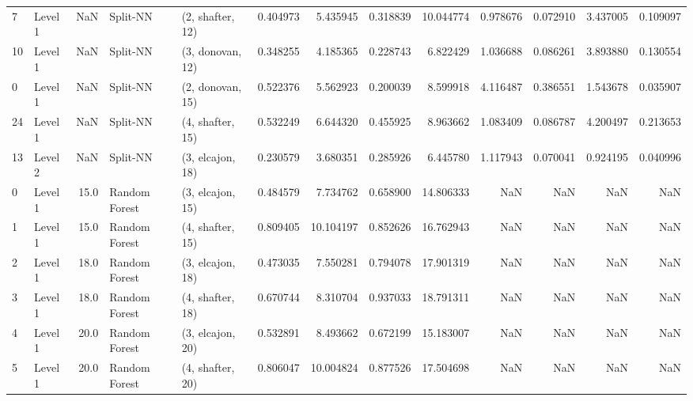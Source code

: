 \begin{tabular}{llrllrrrrrrrr}
7  &   Level 1 &    NaN &       Split-NN &  (2, shafter, 12) &   0.404973 &   5.435945 &  0.318839 &  10.044774 &             0.978676 &               0.072910 &            3.437005 &              0.109097 \\
10 &   Level 1 &    NaN &       Split-NN &  (3, donovan, 12) &   0.348255 &   4.185365 &  0.228743 &   6.822429 &             1.036688 &               0.086261 &            3.893880 &              0.130554 \\
0  &   Level 1 &    NaN &       Split-NN &  (2, donovan, 15) &   0.522376 &   5.562923 &  0.200039 &   8.599918 &             4.116487 &               0.386551 &            1.543678 &              0.035907 \\
24 &   Level 1 &    NaN &       Split-NN &  (4, shafter, 15) &   0.532249 &   6.644320 &  0.455925 &   8.963662 &             1.083409 &               0.086787 &            4.200497 &              0.213653 \\
13 &   Level 2 &    NaN &       Split-NN &  (3, elcajon, 18) &   0.230579 &   3.680351 &  0.285926 &   6.445780 &             1.117943 &               0.070041 &            0.924195 &              0.040996 \\
0  &   Level 1 &   15.0 &  Random Forest &  (3, elcajon, 15) &   0.484579 &   7.734762 &  0.658900 &  14.806333 &                  NaN &                    NaN &                 NaN &                   NaN \\
1  &   Level 1 &   15.0 &  Random Forest &  (4, shafter, 15) &   0.809405 &  10.104197 &  0.852626 &  16.762943 &                  NaN &                    NaN &                 NaN &                   NaN \\
2  &   Level 1 &   18.0 &  Random Forest &  (3, elcajon, 18) &   0.473035 &   7.550281 &  0.794078 &  17.901319 &                  NaN &                    NaN &                 NaN &                   NaN \\
3  &   Level 1 &   18.0 &  Random Forest &  (4, shafter, 18) &   0.670744 &   8.310704 &  0.937033 &  18.791311 &                  NaN &                    NaN &                 NaN &                   NaN \\
4  &   Level 1 &   20.0 &  Random Forest &  (3, elcajon, 20) &   0.532891 &   8.493662 &  0.672199 &  15.183007 &                  NaN &                    NaN &                 NaN &                   NaN \\
5  &   Level 1 &   20.0 &  Random Forest &  (4, shafter, 20) &   0.806047 &  10.004824 &  0.877526 &  17.504698 &                  NaN &                    NaN &                 NaN &                   NaN \\

\end{tabular}

